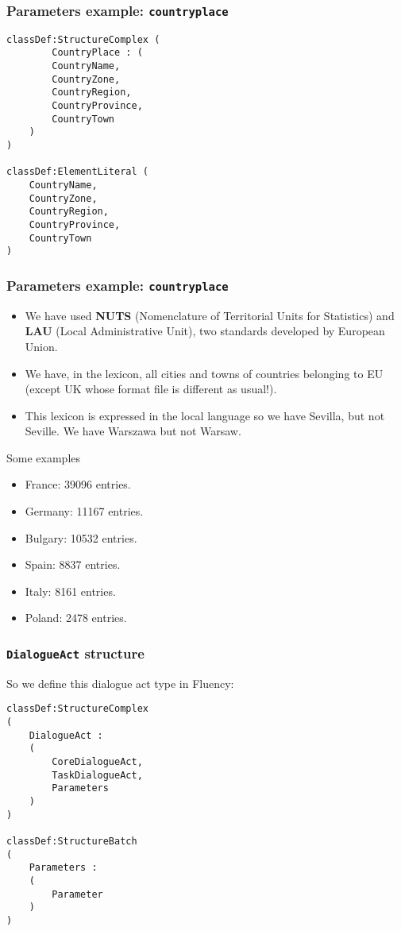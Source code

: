\documentclass[11pt]{beamer}
\begin{document}
\begin{frame}[fragile]
\frametitle{Parameters example: \texttt{countryplace}}
\scriptsize
\begin{lstlisting}[language=lekta]
classDef:StructureComplex ( 
		CountryPlace : (
		CountryName,
		CountryZone,
		CountryRegion,
		CountryProvince,
		CountryTown
	)
)

classDef:ElementLiteral (
	CountryName,
	CountryZone,
	CountryRegion,
	CountryProvince,
	CountryTown
)
\end{lstlisting}
\end{frame}

\begin{frame}[fragile]
\frametitle{Parameters example: \texttt{countryplace}}
{\small
\begin{itemize}
	\item We have used \textbf{NUTS} (Nomenclature of Territorial Units for Statistics) and \textbf{LAU} (Local Administrative Unit), two standards developed by European Union.
	\item We have, in the lexicon, all cities and towns of countries belonging to EU (except UK whose format file is different as usual!).
	\item This lexicon is expressed in the local language so we have Sevilla, but not Seville. We have Warszawa but not Warsaw.
\end{itemize}}
	\pause
	\scriptsize
	\begin{block}{Some examples}
	\begin{itemize}
		\item France: 39096 entries.
		\item Germany: 11167 entries.
		\item Bulgary: 10532 entries.
		\item Spain: 8837 entries.
		\item Italy: 8161 entries.
		\item Poland: 2478 entries. 
	\end{itemize}
	\end{block}
\end{frame}
	
\begin{frame}[fragile]
\frametitle{\texttt{DialogueAct} structure}
So we define this dialogue act type in Fluency:
\scriptsize
\begin{lstlisting}[language=lekta]
classDef:StructureComplex 
( 
 	DialogueAct :
  	(
		CoreDialogueAct,
		TaskDialogueAct,
		Parameters
	)
)	

classDef:StructureBatch
(
	Parameters :
	(
		Parameter
	)
)
\end{lstlisting}
\end{frame}
	
\end{document}
